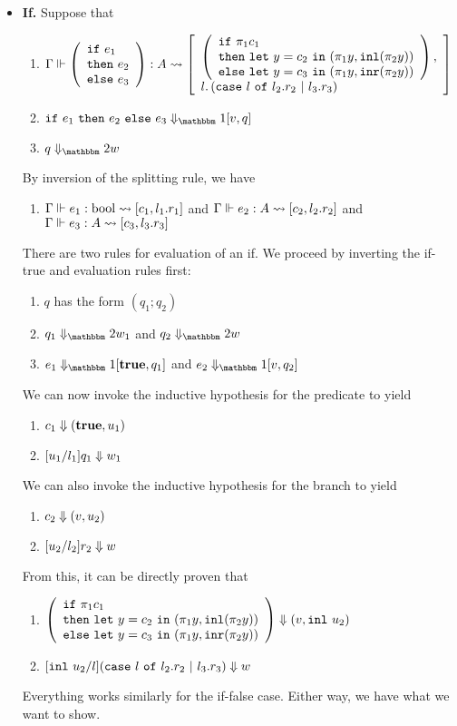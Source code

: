 \documentclass{article}
\begin{document}
\begin{itemize}
\item {\bf If.} Suppose that
\begin{enumerate}
\item ${\Gamma} \Vdash {\left( \begin{array}{l} {\tt if}~{e_1} \\{\tt then}~{e_2}\\{\tt else}~{e_3} \end{array} \right)}:{A} \rightsquigarrow \left[{\begin{array}{l}
									\left(\begin{array}{l} {\tt if}~{\pi_1c_1} \\{\tt then}~{{\tt let}~{y} = {c_2}~{\tt in}~{(\pi_1 y, {\tt inl}(\pi_2 y))}}\\{\tt else}~{{\tt let}~{y} = {c_3}~{\tt in}~{(\pi_1 y, {\tt inr}(\pi_2 y))}} \end{array}
									\right), \\
									l.\left({\tt case}~{l} ~{\tt of}~{l_2.r_2}~{\tt |}~{l_3.r_3}
									\right)
								\end{array}}\right]$
\item $\rsone{\ifthen {e_1}{e_2}{e_3}}{v}{q}$
\item $\reducetwo{q}{w}$
\end{enumerate}
By inversion of the splitting rule, we have
\begin{enumerate}
\item ${{\Gamma}} \Vdash {e_{1}}:{{\rm bool}} \rightsquigarrow \left[{c_{1}, l_{1}.r_{1}}\right]$ and ${{\Gamma}} \Vdash {e_{2}}:{A} \rightsquigarrow \left[{c_{2}, l_{2}.r_{2}}\right]$ and ${{\Gamma}} \Vdash {e_{3}}:{A} \rightsquigarrow \left[{c_{3}, l_{3}.r_{3}}\right]$
\end{enumerate}
There are two rules for evaluation of an if.  We proceed by inverting the if-true and evaluation rules first:
\begin{enumerate}
\item $q$ has the form $(q_1;q_2)$
\item $\reducetwo{q_1}{w_1}$ and $\reducetwo{q_2}{w}$
\item $\rsone{e_1}{\bf true}{q_1}$ and $\rsone{e_2}{v}{q_2}$
\end{enumerate}
We can now invoke the inductive hypothesis for the predicate to yield
\begin{enumerate}
\item ${c_1} \Downarrow {({\bf true},{u_1})}$
\item ${[u_1/l_1]q_1} \Downarrow {w_1}$
\end{enumerate}
We can also invoke the inductive hypothesis for the branch to yield
\begin{enumerate}
\item ${c_2} \Downarrow {({v},{u_2})}$
\item ${[u_2/l_2]r_2} \Downarrow {w}$
\end{enumerate}
From this, it can be directly proven that
\begin{enumerate}
\item ${
		\left(\begin{array}{l} {\tt if}~{\pi_1c_1} \\{\tt then}~{{\tt let}~{y} = {c_2}~{\tt in}~{(\pi_1 y, {\tt inl}(\pi_2 y))}}\\{\tt else}~{{\tt let}~{y} = {c_3}~{\tt in}~{(\pi_1 y, {\tt inr}(\pi_2 y))}} \end{array}
		\right)} \Downarrow {({v},{{\tt inl}~u_2})}$
\item ${[{\tt inl}~u_2/l]({\tt case}~{l} ~{\tt of}~{l_2.r_2}~{\tt |}~{l_3.r_3})} \Downarrow {w}$
\end{enumerate}
Everything works similarly for the if-false case.  Either way, we have what we want to show.

\end{itemize}
\end{document}
